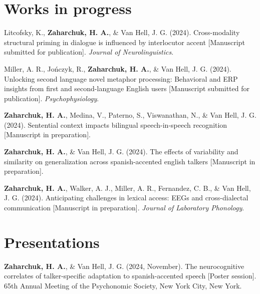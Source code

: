 \documentclass[11pt,a4paper,]{awesome-cv}
\begin{document}
\hypertarget{works-in-progress}{%
\section{Works in progress}\label{works-in-progress}}

\hypertarget{bibliography}{}
\leavevmode{}%
Litcofsky, K., \textbf{\textbf{Zaharchuk, H.} A.}, \& Van Hell, J. G. (2024).
Cross-modality structural priming in dialogue is influenced by
interlocutor accent {[}Manuscript submitted for publication{]}.
\emph{Journal of Neurolinguistics}.

\leavevmode{}%
Miller, A. R., Jończyk, R., \textbf{\textbf{Zaharchuk, H.} A.}, \& Van Hell, J. G. (2024).
Unlocking second language novel metaphor processing: Behavioral and ERP
insights from first and second-language English users {[}Manuscript
submitted for publication{]}. \emph{Psychophysiology}.

\leavevmode{}%
\textbf{\textbf{Zaharchuk, H.} A.}, Medina, V., Paterno, S., Viswanathan, N., \& Van Hell,
J. G. (2024). Sentential context impacts bilingual speech-in-speech
recognition {[}Manuscript in preparation{]}.

\leavevmode{}%
\textbf{\textbf{Zaharchuk, H.} A.}, \& Van Hell, J. G. (2024). The effects of variability
and similarity on generalization across spanish-accented english talkers
{[}Manuscript in preparation{]}.

\leavevmode{}%
\textbf{\textbf{Zaharchuk, H.} A.}, Walker, A. J., Miller, A. R., Fernandez, C. B., \& Van
Hell, J. G. (2024). Anticipating challenges in lexical access: EEGs and
cross-dialectal communication {[}Manuscript in preparation{]}.
\emph{Journal of Laboratory Phonology}.

\hypertarget{presentations}{%
\section{Presentations}\label{presentations}}

\hypertarget{bibliography}{}
\leavevmode{}%
\textbf{\textbf{Zaharchuk, H.} A.}, \& Van Hell, J. G. (2024, November). The
neurocognitive correlates of talker-specific adaptation to
spanish-accented speech {[}Poster session{]}. 65th Annual Meeting of the
Psychonomic Society, New York City, New York.
\end{document}
